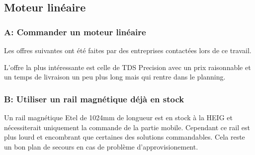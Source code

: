 \subsection{Moteur linéaire}
\subsubsection{A: Commander un moteur linéaire}
Les offres suivantes ont été faites par des entreprises contactées lors de ce travail.

\begin{table}[H]
    \centering
    \caption{Offres pour le moteur linéaire}
    \label{tab:OffreMot}
\end{table}

L'offre la plus intéressante est celle de TDS Precision avec un prix raisonnable et un temps de livraison un peu plus long mais qui rentre dans le planning.

\subsubsection{B: Utiliser un rail magnétique déjà en stock}
Un rail magnétique Etel de 1024mm de longueur est en stock à la HEIG et nécessiterait uniquement la commande de la partie mobile. Cependant ce
rail est plus lourd et encombrant que certaines des solutions commandables. Cela reste un bon plan de secours en cas de problème d'approvisionement.

